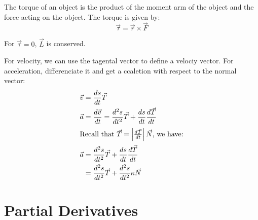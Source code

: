 \documentclass[11pt]{article}
\begin{document}
\begin{definition}[Torque]
    The torque of an object is the product of the moment arm of the object and the force acting on the object. The torque is given by:
    \begin{equation}
        \vec{\tau} = \vec{r} \times \vec{F}
    \end{equation}
\end{definition}
For $\vec{\tau} = 0$, $\vec{L}$ is conserved.
\begin{definition}[Acceleration]
    For velocity, we can use the tagental vector to define a velociy vector. For acceleration, differenciate it and get a ccaletion with respect to the normal vector:
    \begin{align}
        \vec{v} &= \frac{ds}{dt}\vec{T} \\
        \vec{a} &= \frac{d\vec{v}}{dt} = \frac{d^2s}{dt^2}\vec{T} + \frac{ds}{dt}\frac{d\vec{T}}{dt} \nonumber \\
        \intertext{Recall that $\vec{T} = \left | \frac{d\vec{T}}{dt} \right | \vec{N}$, we have:}
        \vec{a} &= \frac{d^2s}{dt^2}\vec{T} + \frac{ds}{dt}\frac{d\vec{T}}{dt} \nonumber \\
        &= \frac{d^2s}{dt^2}\vec{T} + \frac{d^2s}{dt^2}\kappa\vec{N}
    \end{align}
\end{definition}
\section{Partial Derivatives}
\end{document}

